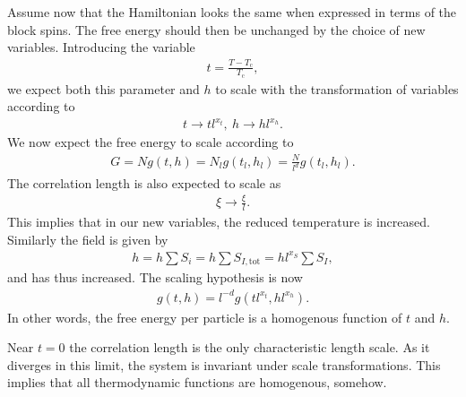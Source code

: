 Assume now that the Hamiltonian looks the same when expressed in terms of the block spins. The free energy should then be unchanged by the choice of new variables. Introducing the variable
\begin{align*}
	t = \frac{T - T_{\text{c}}}{T_{\text{c}}},
\end{align*}
we expect both this parameter and $h$ to scale with the transformation of variables according to
\begin{align*}
	t\to tl^{x_{t}},\ h\to hl^{x_{h}}.
\end{align*}
We now expect the free energy to scale according to
\begin{align*}
	G = Ng(t, h) = N_{l}g(t_{l}, h_{l}) = \frac{N}{l^{d}}g(t_{l}, h_{l}).
\end{align*}
The correlation length is also expected to scale as
\begin{align*}
	\xi\to\frac{\xi}{l}.
\end{align*}
This implies that in our new variables, the reduced temperature is increased. Similarly the field is given by
\begin{align*}
	h = h\sum S_{i} = h\sum S_{I, \text{tot}} = hl^{x_{S}}\sum S_{I},
\end{align*}
and has thus increased. The scaling hypothesis is now
\begin{align*}
	g(t, h) = l^{-d}g(tl^{x_{t}}, hl^{x_{h}}).
\end{align*}
In other words, the free energy per particle is a homogenous function of $t$ and $h$.

Near $t = 0$ the correlation length is the only characteristic length scale. As it diverges in this limit, the system is invariant under scale transformations. This implies that all thermodynamic functions are homogenous, somehow.

